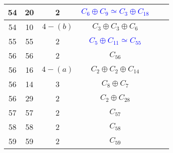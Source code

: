 \documentclass[12pt, openany]{report}
\begin{document}
\begin{tabular}{|c||c|c|c|c|c|}
\hline  54&  20 & 2 &  \textcolor{blue}{$ C_{6}\oplus C_{9} \simeq C_{3} \oplus C_{18}$} \\
\hline  54& 10& $4-(b)$ &$ C_{3}\oplus C_{3}\oplus C_{6} $\\
\hline  55&  55 & 2 &  \textcolor{blue}{$C_{5}\oplus C_{11} \simeq C_{55}$}\\
\hline  56& 56 & 2 & $C_{56}$\\
\hline  56&16&$4-(a)$& $C_{2}\oplus C_{2}\oplus C_{14}$\\
\hline  56& 14 &3 & $C_{8}\oplus C_{7}$\\ %
\hline  56& 29 & 2 & $C_{2}\oplus C_{28}$\\
\hline  57&  57 & 2 & $C_{57}$ \\ 
\hline  58&  58 & 2 & $C_{58}$ \\
\hline  59&  59 & 2 & $C_{59}$ \\


\end{tabular}
\end{document}
